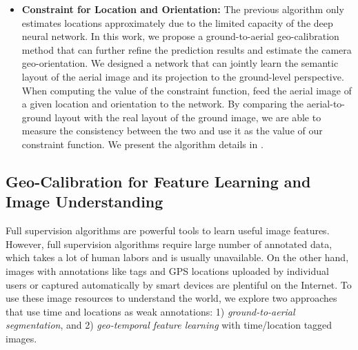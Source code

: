 \begin{itemize}[noitemsep]
  \item \textbf{Constraint for Location and Orientation:}
  The previous algorithm only estimates locations approximately
  due to the limited capacity of the deep neural network. In this
  work, we propose a ground-to-aerial geo-calibration method that can
  further refine the prediction results and estimate the
  camera geo-orientation.
  We designed a network that can jointly learn the semantic layout of
  the aerial image and its projection to the ground-level perspective.
  When computing the value of the constraint function, feed the aerial
  image of a given location and orientation to the network. 
  By comparing the aerial-to-ground layout with the real layout of the
  ground image, we are able to measure the consistency between the two
  and use it as the value of our constraint function.
  We present the algorithm details in .
  \newline

\end{itemize}


\subsection{Geo-Calibration for Feature Learning and Image
Understanding}
Full supervision algorithms are powerful tools to learn useful image
features. However, full supervision algorithms require large number
of annotated data, which takes a lot of human labors and is usually
unavailable.
On the other hand, images with annotations like tags and GPS locations
uploaded by individual users or captured automatically by smart
devices are plentiful on the Internet.
To use these image resources to understand the world,
we explore two approaches that use time and
locations as weak annotations: 1) {\em ground-to-aerial segmentation}, and 2)
{\em geo-temporal feature learning} with time/location tagged images.
 
